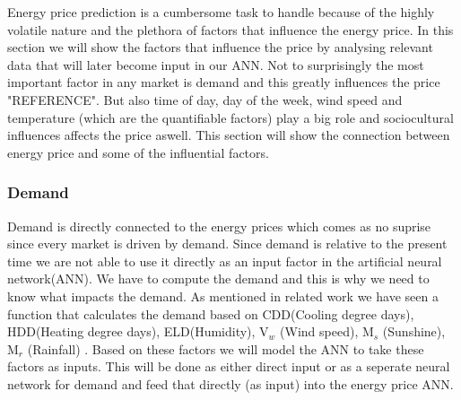 Energy price prediction is a cumbersome task to handle because of the highly volatile nature and the plethora of factors that influence the energy price. In this section we will show the factors that influence the price by analysing relevant data that will later become input in our ANN. Not to surprisingly the most important factor in any market is demand and this greatly influences the price "REFERENCE". But also time of day, day of the week, wind speed and temperature (which are the quantifiable factors) play a big role and sociocultural influences affects the price aswell. This section will show the connection between energy price and some of the influential factors.



\subsubsection{Demand}
Demand is directly connected to the energy prices which comes as no suprise since every market is driven by demand. Since demand is relative to the present time we are not able to use it directly as an input factor in the artificial neural network(ANN). We have to compute the demand and this is why we need to know what impacts the demand. As mentioned in related work we have seen a function that calculates the demand based on CDD(Cooling degree days), HDD(Heating degree days), ELD(Humidity), V$_w$ (Wind speed), M$_s$ (Sunshine), M$_r$ (Rainfall) \cite{19}. Based on these factors we will model the ANN to take these factors as inputs. This will be done as either direct input or as a seperate neural network for demand and feed that directly (as input) into the energy price ANN.

